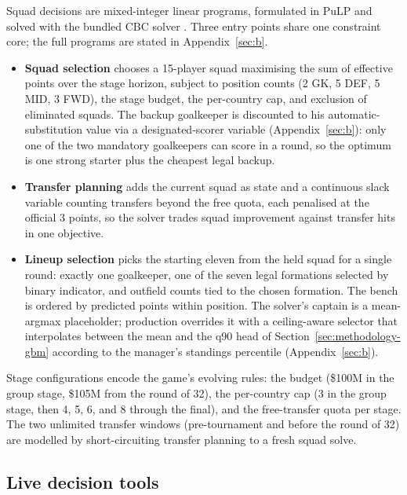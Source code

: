 Squad decisions are mixed-integer linear programs, formulated in PuLP
\citep{pulp} and solved with the bundled CBC solver \citep{cbc}.
Three entry points share one constraint core; the full programs are
stated in Appendix~\ref{sec:b}.

\begin{itemize}
\item \textbf{Squad selection} chooses a 15-player squad maximising
  the sum of effective points over the stage horizon, subject to
  position counts (2 GK, 5 DEF, 5 MID, 3 FWD), the stage budget, the
  per-country cap, and exclusion of eliminated squads. The backup
  goalkeeper is discounted to his automatic-substitution value via a
  designated-scorer variable (Appendix~\ref{sec:b}): only one of the
  two mandatory goalkeepers can score in a round, so the optimum is
  one strong starter plus the cheapest legal backup.
\item \textbf{Transfer planning} adds the current squad as state and
  a continuous slack variable counting transfers beyond the free
  quota, each penalised at the official 3 points, so the solver
  trades squad improvement against transfer hits in one objective.
\item \textbf{Lineup selection} picks the starting eleven from the
  held squad for a single round: exactly one goalkeeper, one of the
  seven legal formations selected by binary indicator, and outfield
  counts tied to the chosen formation. The bench is ordered by
  predicted points within position. The solver's captain is a
  mean-argmax placeholder; production overrides it with a
  ceiling-aware selector that interpolates between the mean and the
  q90 head of Section~\ref{sec:methodology-gbm} according to the
  manager's standings percentile (Appendix~\ref{sec:b}).
\end{itemize}

Stage configurations encode the game's evolving rules: the budget
(\$100M in the group stage, \$105M from the round of 32), the
per-country cap (3 in the group stage, then 4, 5, 6, and 8 through
the final), and the free-transfer quota per stage. The two unlimited
transfer windows (pre-tournament and before the round of 32) are
modelled by short-circuiting transfer planning to a fresh squad
solve.

\subsection{Live decision tools}
\label{sec:methodology-live}

